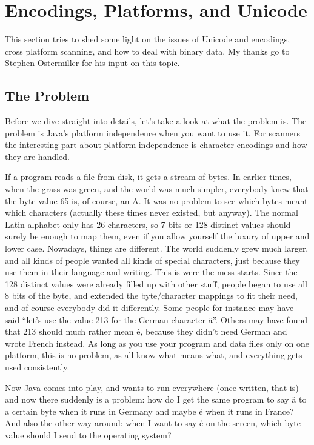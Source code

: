 \documentclass[11pt]{scrartcl}
\begin{document}
\section{Encodings, Platforms, and Unicode\label{sec:encodings}}

This section tries to shed some light on the issues of Unicode and
encodings, cross platform scanning, and how to deal with binary data.
My thanks go to Stephen Ostermiller for his input on this topic.

\subsection{The Problem\label{sec:howtoencoding}}

Before we dive straight into details, let's take a look at what the
problem is. The problem is Java's platform independence when you want
to use it. For scanners the interesting part about platform
independence is character encodings and how they are handled.

If a program reads a file from disk, it gets a stream of bytes.  In
earlier times, when the grass was green, and the world was much
simpler, everybody knew that the byte value 65 is, of course, an A.
It was no problem to see which bytes meant which characters (actually
these times never existed, but anyway).  The normal Latin alphabet
only has 26 characters, so 7 bits or 128 distinct values should surely
be enough to map them, even if you allow yourself the luxury of upper
and lower case.  Nowadays, things are different. The world suddenly
grew much larger, and all kinds of people wanted all kinds of special
characters, just because they use them in their language and writing.
This is were the mess starts. Since the 128 distinct values were
already filled up with other stuff, people began to use all 8 bits of
the byte, and extended the byte/character mappings to fit their need,
and of course everybody did it differently. Some people for instance
may have said ``let's use the value 213 for the German character {\"a}''.  Others
may have found that 213 should much rather mean {\'e}, because they didn't need
German and wrote French instead. As long as you use your program and
data files only on one platform, this is no problem, as all know what
means what, and everything gets used consistently.

Now Java comes into play, and wants to run everywhere (once written,
that is) and now there suddenly is a problem: how do I get the same
program to say {\"a} to a certain byte when it runs in Germany and maybe {\'e}
when it runs in France? And also the other way around: when I want to
say {\'e} on the screen, which byte value should I send to the operating
system?
\end{document}
